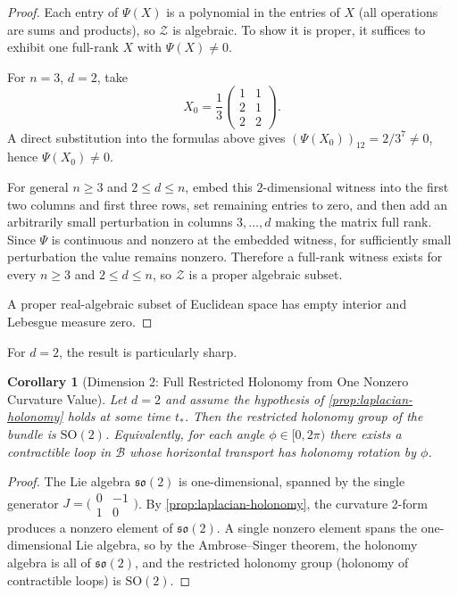 \documentclass{article}
\newcommand{\so}{\mathfrak{so}}
\theoremstyle{plain}
\newtheorem{corollary}{Corollary}
\theoremstyle{definition}
\theoremstyle{remark}
\begin{document}
\begin{proof}
Each entry of $\Psi(X)$ is a polynomial in the entries of $X$ (all operations are sums and products), so $\mathcal{Z}$ is algebraic.
To show it is proper, it suffices to exhibit one full-rank $X$ with $\Psi(X) \neq 0$.

For $n = 3$, $d = 2$, take
\begin{equation}
X_0 = \frac{1}{3}\begin{pmatrix} 1 & 1 \\ 2 & 1 \\ 2 & 2 \end{pmatrix}.
\end{equation}
A direct substitution into the formulas above gives
$(\Psi(X_0))_{12} = 2/3^7 \neq 0$,
hence $\Psi(X_0) \neq 0$.

For general $n \ge 3$ and $2 \le d \le n$, embed this $2$-dimensional witness into the first two columns and first three rows, set remaining entries to zero, and then add an arbitrarily small perturbation in columns $3, \ldots, d$ making the matrix full rank.
Since $\Psi$ is continuous and nonzero at the embedded witness, for sufficiently small perturbation the value remains nonzero.
Therefore a full-rank witness exists for every $n \ge 3$ and $2 \le d \le n$, so $\mathcal{Z}$ is a proper algebraic subset.

A proper real-algebraic subset of Euclidean space has empty interior and Lebesgue measure zero.
\end{proof}

For $d = 2$, the result is particularly sharp.

\begin{corollary}[Dimension 2: Full Restricted Holonomy from One Nonzero Curvature Value]\label{cor:d2-holonomy}
Let $d = 2$ and assume the hypothesis of \cref{prop:laplacian-holonomy} holds at some time $t_*$.
Then the restricted holonomy group of the bundle is $\mathrm{SO}(2)$.
Equivalently, for each angle $\phi \in [0, 2\pi)$ there exists a contractible loop in $\mathcal{B}$ whose horizontal transport has holonomy rotation by $\phi$.
\end{corollary}

\begin{proof}
The Lie algebra $\so(2)$ is one-dimensional, spanned by the single generator $J = \bigl(\begin{smallmatrix} 0 & -1 \\ 1 & 0 \end{smallmatrix}\bigr)$.
By \cref{prop:laplacian-holonomy}, the curvature 2-form produces a nonzero element of $\so(2)$.
A single nonzero element spans the one-dimensional Lie algebra, so by the Ambrose--Singer theorem, the holonomy algebra is all of $\so(2)$, and the restricted holonomy group (holonomy of contractible loops) is $\mathrm{SO}(2)$.
\end{proof}
\end{document}
